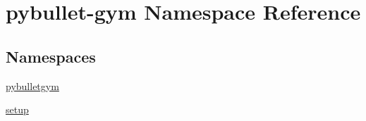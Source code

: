 \hypertarget{namespacepybullet-gym}{}\section{pybullet-\/gym Namespace Reference}
\label{namespacepybullet-gym}
\subsection*{Namespaces}
\begin{DoxyCompactItemize}
\item 
 \hyperlink{namespacepybullet-gym_1_1pybulletgym}{pybulletgym}
\item 
 \hyperlink{namespacepybullet-gym_1_1setup}{setup}
\end{DoxyCompactItemize}
